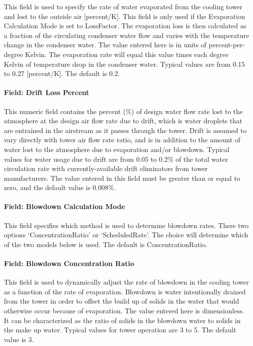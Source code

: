 This field is used to specify the rate of water evaporated from the cooling tower and lost to the outside air {[}percent/K{]}. This field is only used if the Evaporation Calculation Mode is set to LossFactor. The evaporation loss is then calculated as a fraction of the circulating condenser water flow and varies with the temperature change in the condenser water. The value entered here is in units of percent-per-degree Kelvin. The evaporation rate will equal this value times each degree Kelvin of temperature drop in the condenser water. Typical values are from 0.15 to 0.27 {[}percent/K{]}. The default is 0.2.

\paragraph{Field: Drift Loss Percent}\label{field-drift-loss-percent-3}

This numeric field contains the percent (\%) of design water flow rate lost to the atmosphere at the design air flow rate due to drift, which is water droplets that are entrained in the airstream as it passes through the tower. Drift is assumed to vary directly with tower air flow rate ratio, and is in addition to the amount of water lost to the atmosphere due to evaporation and/or blowdown. Typical values for water usage due to drift are from 0.05 to 0.2\% of the total water circulation rate with currently-available drift eliminators from tower manufacturers. The value entered in this field must be greater than or equal to zero, and the default value is 0.008\%.

\paragraph{Field: Blowdown Calculation Mode}\label{field-blowdown-calculation-mode-3}

This field specifies which method is used to determine blowdown rates. There two options `ConcentrationRatio' or `ScheduledRate'. The choice will determine which of the two models below is used. The default is ConcentrationRatio.

\paragraph{Field: Blowdown Concentration Ratio}\label{field-blowdown-concentration-ratio-3}

This field is used to dynamically adjust the rate of blowdown in the cooling tower as a function of the rate of evaporation. Blowdown is water intentionally drained from the tower in order to offset the build up of solids in the water that would otherwise occur because of evaporation. The value entered here is dimensionless. It can be characterized as the ratio of solids in the blowdown water to solids in the make up water. Typical values for tower operation are 3 to 5. The default value is 3.


